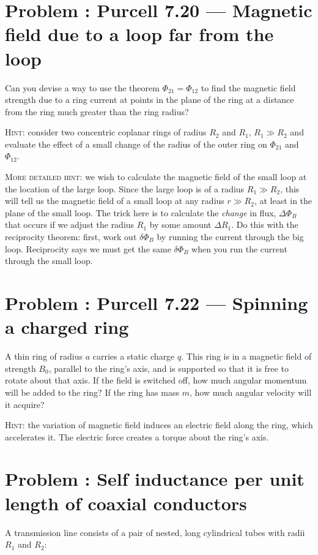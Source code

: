 \documentclass[problems]{esg8022pset}
\begin{document}
\section{Problem \thesection: Purcell 7.20 --- Magnetic field due to a loop far from the loop}
  Can you devise a way to use the theorem $\Phi_{21}=\Phi_{12}$ to find the
  magnetic field strength due to a ring current at points in the plane of the
  ring at a distance from the ring much greater than the ring radius?

  \noindent \textsc{Hint}: consider two concentric coplanar rings of radius
  $R_{2}$ and $R_{1}$, $R_{1}\gg R_{2}$ and evaluate the effect of a small
  change of the radius of the outer ring on $\Phi_{21}$ and $\Phi_{12}$.

  \noindent \textsc{More detailed hint}:  we wish to calculate the magnetic
  field of the small loop at the location of the large loop.  Since the large
  loop is of a radius $R_1 \gg R_2$, this will tell us the magnetic field of a
  small loop at any radius $r \gg R_2$, at least in the plane of the small
  loop. The trick here is to calculate the {\it change} in flux, $\Delta\Phi_B$
  that occurs if we adjust the radius $R_1$ by some amount $\Delta R_1$.  Do
  this with the reciprocity theorem: first, work out $\delta\Phi_B$ by running
  the current through the big loop.  Reciprocity says we must get the same
  $\delta\Phi_B$ when you run the current through the small loop.
\section{Problem \thesection: Purcell 7.22 --- Spinning a charged ring}
  A thin ring of radius $a$ carries a static charge $q$. This ring is in a
  magnetic field of strength $B_0$, parallel to the ring's axis, and is
  supported so that it is free to rotate about that axis. If the field is
  switched off, how much angular momentum will be added to the ring? If the
  ring has mass $m$, how much angular velocity will it acquire?

  \noindent \textsc{Hint}: the variation of magnetic field induces an electric
  field along the ring, which accelerates it. The electric force creates a
  torque about the ring's axis.
\section{Problem \thesection: Self inductance per unit length of coaxial conductors }
  A transmission line consists of a pair of nested, long cylindrical
  tubes with radii $R_1$ and $R_2$:
\end{document}
